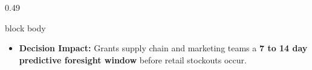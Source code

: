 \documentclass[aspectratio=169, 10pt]{beamer}
\newenvironment{card}[1][]{%
        \begin{beamercolorbox}[rounded=true,shadow=false,wd=\linewidth,sep=3.5pt,#1]{block body}%
        \fontsize{7.8pt}{9.8pt}\selectfont%
    }{%
        \end{beamercolorbox}%
    }
\begin{document}
\begin{frame}[t]
\begin{columns}[T]
\begin{column}{0.49\textwidth}
\begin{card}
\begin{itemize}
  11.2\% error reduction over baseline persistence.                                                                                                                                                    
                        \item \textbf{Decision Impact:} Grants supply chain and marketing teams a \textbf{7 to 14 day predictive foresight window} before retail stockouts occur.                      
                    \end{itemize}                                                                                                                                                                      
                \end{card}                                                                                                                                                                             
            \end{column}                                                                                                                                                                               
                                                                                                                                                                                                       

\end{columns}
\end{frame}
\end{document}
